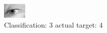 \begin{figure}[h!]
\begin{center}
\includegraphics[width=0.60\columnwidth]{figures/ID2899_class_3_target_4.png}
\end{center}
\caption{ Classification: 3 actual target: 4}
\label{fig:ID2899_class_3_target_4}
\end{figure}
